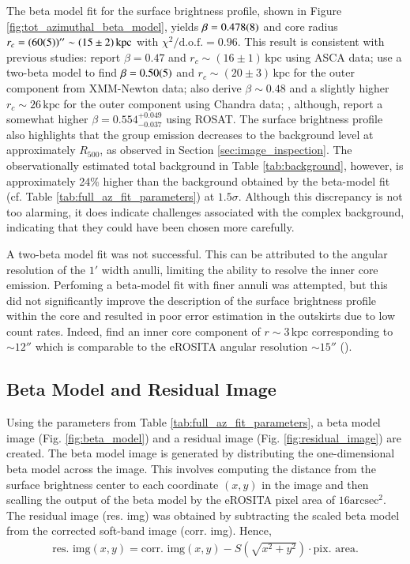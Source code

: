 The beta model fit for the surface brightness profile, shown in Figure \ref{fig:tot_azimuthal_beta_model}, yields \(\beta = \num{0.478\pm0.008}\) and core radius \(r_c = (\num{60\pm5})'' \sim (15\pm2)\,\text{kpc}\) with \(\chi^2/\text{d.o.f.} = 0.96\). This result is consistent with previous studies: \cite{Kawaharada_2003} report \(\beta = 0.47\) and \(r_c \sim (16\pm1)\,\text{kpc}\) using ASCA data; \cite{Kawaharada_2009} use a two-beta model to find \(\beta = \num{0.50\pm0.05}\) and \(r_c \sim (20\pm3)\,\text{kpc}\) for the outer component from XMM-Newton data; \cite{Sun_2003} also derive \(\beta \sim 0.48\) and a slightly higher \(r_c \sim 26\,\text{kpc}\) for the outer component using Chandra data; \cite{Reiprich_2002}, although, report a somewhat higher \(\beta = 0.554^{+0.049}_{-0.037}\) using ROSAT. The surface brightness profile also highlights that the group emission decreases to the background level at approximately \(R_{500}\), as observed in Section \ref{sec:image_inspection}. The observationally estimated total background in Table \ref{tab:background}, however, is approximately 24\% higher than the background obtained by the beta-model fit (cf. Table \ref{tab:full_az_fit_parameters}) at \(1.5\sigma\). Although this discrepancy is not too alarming, it does indicate challenges associated with the complex background, indicating that they could have been chosen more carefully.

A two-beta model fit was not successful. This can be attributed to the angular resolution of the \(1'\) width anulli, limiting the ability to resolve the inner core emission. Perfoming a beta-model fit with finer annuli was attempted, but this did not significantly improve the description of the surface brightness profile within the core and resulted in poor error estimation in the outskirts due to low count rates. Indeed, \cite{Kawaharada_2009} find an inner core component of \(r \sim 3\,\text{kpc}\) corresponding to \(\sim 12'' \) which is comparable to the eROSITA angular resolution \(\sim 15''\) (\cite{Predehl2021}).
\subsection{Beta Model and Residual Image}
Using the parameters from Table \ref{tab:full_az_fit_parameters}, a beta model image (Fig. \ref{fig:beta_model}) and a residual image (Fig. \ref{fig:residual_image}) are created. The beta model image is generated by distributing the one-dimensional beta model across the image. This involves computing the distance from the surface brightness center to each coordinate \((x, y)\) in the image and then scalling the output of the beta model by the eROSITA pixel area of \(16\text{arcsec}^2\). The residual image (res. img) was obtained by subtracting the scaled beta model from the corrected soft-band image (corr. img). Hence,
\begin{align*}
    \text{res. img}(x, y) = \text{corr. img}(x, y) - S\left(\sqrt{x^2 + y^2}\right) \cdot \text{pix. area}.
\end{align*}

